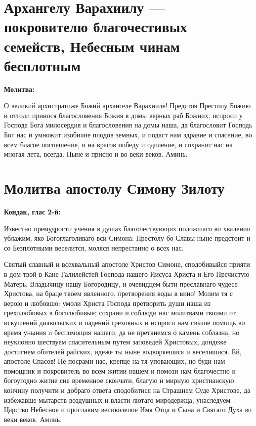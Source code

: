 {\bigskip\bigskip\noparindent\begin{minipage}{\textwidth}
\section{Архангелу Варахиилу --- покровителю благочестивых семейств, Небесным чинам бесплотным}

\restoreparindent\bfseries Молитва:\normalfont{}\par

О великий архистратиже Божий архангеле Варахииле! Предстоя Престолу Божию и оттоли принося благословения Божия в домы верных раб Божиих, испроси у Господа Бога милосердия и благословения на домы наша, да благословит Господь Бог нас и умножит изобилие плодов земных, и подаст нам здравие и спасение, во всем благое поспешение, и на врагов победу и одоление, и сохранит нас на многая лета, всегда. Ныне и присно и во веки веков. Аминь.
\end{minipage}}

\shortpage[2]{}

\section{Молитва апостолу Симону Зилоту}
 
\bfseries Кондак, глас 2-й:\normalfont{}


Известно премудрости учения в душах благочествующих положшаго во хвалении ублажим, яко Богоглаголиваго вси Симона: Престолу бо Славы ныне предстоит и со Безплотными веселится, моляся непрестанно о всех нас.




Святый славный и всехвальный апостоле Христов Симоне, сподобивыйся прияти в дом твой в Кане Галилейстей Господа нашего Иисуса Христа и Его Пречистую Матерь, Владычицу нашу Богородицу, и очевидцем быти преславнаго чудесе Христова, на браце твоем явленного, претворения воды в вино! Молим тя с верою и любовшо: умоли Христа Господа претворить души наша из грехолюбивых в боголюбивыя; сохрани и соблюди нас молитвами твоими от искушений диавольских и падений греховных и испроси нам свыше помощь во время уныния и беспомощия нашего, да не преткнемся о камень соблазна, но неуклонно шествуем спасительным путем заповедей Христовых, дондеже достигнем обителей райских, идеже ты ныне водворяешися и веселишися. Ей, апостоле Спасов! Не посрами нас, крепце на тя уповающих, но буди нам помощник и покровитель во всем житии нашем и помози нам благочестно и богоугодно житие сие временное скончати, благую и мирную христианскую кончину получити и добраго ответа сподобитися на Страшнем Суде Христове, да избежавше мытарств воздушных и власти лютаго миродержца, унаследуем Царство Небесное и прославим великолепое Имя Отца и Сына и Святаго Духа во веки веков. Аминь.\mychapterending

